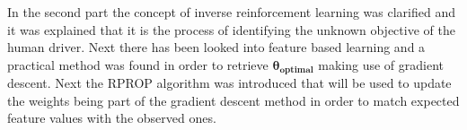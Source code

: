 In the second part the concept of inverse reinforcement learning was clarified and it was explained that it is the process of identifying the unknown objective of the human driver. Next there has been looked into feature based learning and a practical method was found in order to retrieve $\bm{\theta_{optimal}}$ making use of gradient descent. Next the RPROP algorithm was introduced that will be used to update the weights being part of the gradient descent method in order to match expected feature values with the observed ones.

\newpage


%


